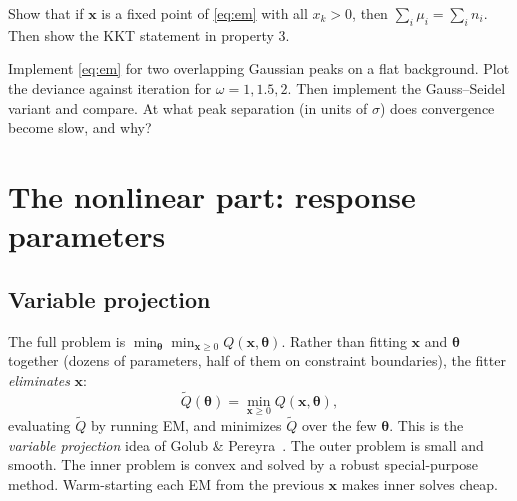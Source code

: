 \documentclass[11pt]{article}
\newcounter{exercise}[section]
\newcommand{\vth}{\bm{\theta}}
\newcommand{\vx}{\bm{x}}
\begin{document}
\begin{exercise}[A]
Show that if $\vx$ is a fixed point of \cref{eq:em} with all $x_k>0$, then $\sum_i\mu_i = \sum_i n_i$. Then show the KKT statement in property 3.
\end{exercise}

\begin{exercise}[P]
Implement \cref{eq:em} for two overlapping Gaussian peaks on a flat background. Plot the deviance against iteration for $\omega = 1, 1.5, 2$. Then implement the Gauss--Seidel variant and compare. At what peak separation (in units of $\sigma$) does convergence become slow, and why?
\end{exercise}

\section{The nonlinear part: response parameters}\label{sec:theta}
\subsection{Variable projection}
The full problem is $\min_{\vth}\min_{\vx\ge0}Q(\vx,\vth)$. Rather than fitting $\vx$ and $\vth$ together (dozens of parameters, half of them on constraint boundaries), the fitter \emph{eliminates} $\vx$:
\begin{equation}
\tilde Q(\vth) = \min_{\vx\ge0} Q(\vx,\vth), \label{eq:varpro}
\end{equation}
evaluating $\tilde Q$ by running EM, and minimizes $\tilde Q$ over the few $\vth$. This is the \emph{variable projection} idea of Golub \& Pereyra~\cite{GolubPereyra}. The outer problem is small and smooth. The inner problem is convex and solved by a robust special-purpose method. Warm-starting each EM from the previous $\vx$ makes inner solves cheap.
\end{document}
